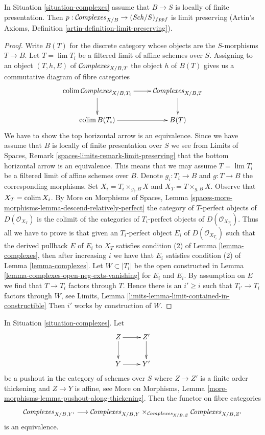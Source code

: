 \begin{lemma}
\label{lemma-complexes-limits}
In Situation \ref{situation-complexes} assume that $B \to S$
is locally of finite presentation. Then
$p : \mathcal{C}\!\mathit{omplexes}_{X/B} \to (\mathit{Sch}/S)_{fppf}$ is limit preserving
(Artin's Axioms, Definition \ref{artin-definition-limit-preserving}).
\end{lemma}

\begin{proof}
Write $B(T)$ for the discrete category whose
objects are the $S$-morphisms $T \to B$. Let $T = \lim T_i$ be a filtered
limit of affine schemes over $S$. Assigning to an object
$(T, h, E)$ of $\mathcal{C}\!\mathit{omplexes}_{X/B, T}$ the object $h$
of $B(T)$ gives us a commutative diagram of fibre categories
$$
\xymatrix{
\colim \Complexesstack_{X/B, T_i} \ar[r] \ar[d] &
\Complexesstack_{X/B, T} \ar[d] \\
\colim B(T_i) \ar[r] & B(T)
}
$$
We have to show the top horizontal arrow is an equivalence. Since
we have assume that $B$ is locally of finite presentation over $S$
we see from
Limits of Spaces, Remark \ref{spaces-limits-remark-limit-preserving}
that the bottom horizontal arrow is an equivalence. This means that
we may assume $T = \lim T_i$ be a filtered limit of affine schemes over
$B$. Denote $g_i : T_i \to B$ and $g : T \to B$ the corresponding
morphisms. Set $X_i = T_i \times_{g_i, B} X$ and $X_T = T \times_{g, B} X$.
Observe that $X_T = \mathop{\mathrm{colim}}\nolimits X_i$.
By More on Morphisms of Spaces, Lemma
\ref{spaces-more-morphisms-lemma-descend-relatively-perfect}
the category of $T$-perfect objects of $D(\mathcal{O}_{X_T})$
is the colimit of the categories of $T_i$-perfect objects
of $D(\mathcal{O}_{X_{T_i}})$.
Thus all we have to prove is that given an $T_i$-perfect object
$E_i$ of $D(\mathcal{O}_{X_{T_i}})$ such that
the derived pullback $E$ of $E_i$ to $X_T$ satisfies
condition (2) of Lemma \ref{lemma-complexes},
then after increasing $i$ we have that
$E_i$ satisfies
condition (2) of Lemma \ref{lemma-complexes}.
Let $W \subset |T_i|$ be the open constructed
in Lemma \ref{lemma-complexes-open-neg-exts-vanishing}
for $E_i$ and $E_i$. By assumption on $E$ we find
that $T \to T_i$ factors through $T$.
Hence there is an $i' \geq i$
such that $T_{i'} \to T_i$ factors through $W$, see
Limits, Lemma \ref{limits-lemma-limit-contained-in-constructible}
Then $i'$ works by construction of $W$.
\end{proof}

\begin{lemma}
\label{lemma-complexes-RS-star}
In Situation \ref{situation-complexes}. Let
$$
\xymatrix{
Z \ar[r] \ar[d] & Z' \ar[d] \\
Y \ar[r] & Y'
}
$$
be a pushout in the category of schemes over $S$ where
$Z \to Z'$ is a finite order thickening and $Z \to Y$ is affine, see
More on Morphisms, Lemma \ref{more-morphisms-lemma-pushout-along-thickening}.
Then the functor on fibre categories
$$
\mathcal{C}\!\mathit{omplexes}_{X/B, Y'}
\longrightarrow
\mathcal{C}\!\mathit{omplexes}_{X/B, Y}
\times_{\mathcal{C}\!\mathit{omplexes}_{X/B, Z}}
\mathcal{C}\!\mathit{omplexes}_{X/B, Z'}
$$
is an equivalence.
\end{lemma}

